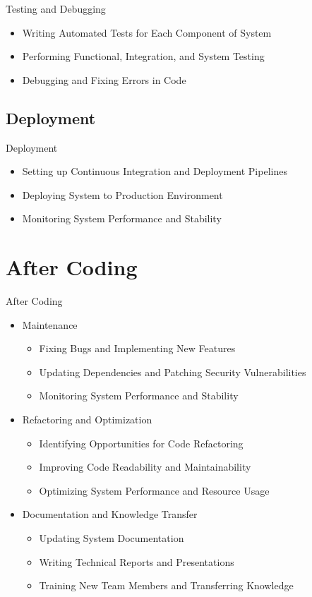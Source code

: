 \documentclass{beamer}
\begin{document}
\begin{frame}{Testing and Debugging}
  \begin{itemize}
      \item Writing Automated Tests for Each Component of System
      \item Performing Functional, Integration, and System Testing
      \item Debugging and Fixing Errors in Code
  \end{itemize}
\end{frame}

\subsection{Deployment}
\begin{frame}{Deployment}
  \begin{itemize}
      \item Setting up Continuous Integration and Deployment Pipelines
      \item Deploying System to Production Environment
      \item Monitoring System Performance and Stability
  \end{itemize}
\end{frame}

\section{After Coding}
\begin{frame}{After Coding}
  \begin{itemize}
      \item Maintenance
      \begin{itemize}
          \item Fixing Bugs and Implementing New Features
          \item Updating Dependencies and Patching Security Vulnerabilities
          \item Monitoring System Performance and Stability
      \end{itemize}
      \item Refactoring and Optimization
      \begin{itemize}
          \item Identifying Opportunities for Code Refactoring
          \item Improving Code Readability and Maintainability
          \item Optimizing System Performance and Resource Usage
      \end{itemize}
      \item Documentation and Knowledge Transfer
      \begin{itemize}
          \item Updating System Documentation
          \item Writing Technical Reports and Presentations
          \item Training New Team Members and Transferring Knowledge
      \end{itemize}
  \end{itemize}
\end{frame}
\end{document}
